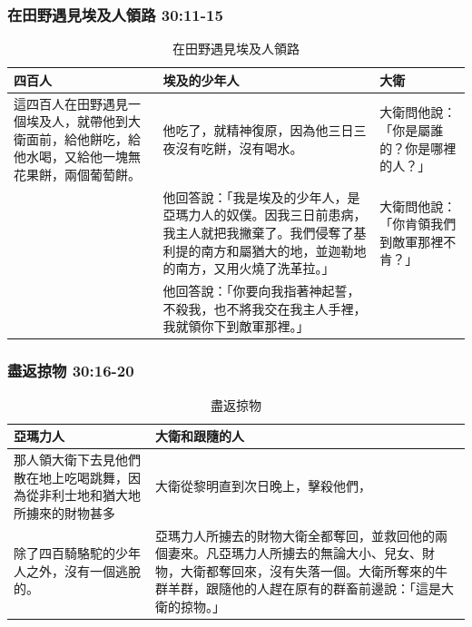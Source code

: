 \subsubsection{在田野遇見埃及人領路 30:11-15}
\begin{table}[H]
\hspace*{-5mm}
\centering
\begin{tabular}{p{5.85cm}|p{}|p{2.5cm}}\hline\hline
四百人&埃及的少年人&大衛\\\hline
這四百人在田野遇見一個埃及人，就帶他到大衛面前，給他餅吃，給他水喝，又給他一塊無花果餅，兩個葡萄餅。
&他吃了，就精神復原，因為他三日三夜沒有吃餅，沒有喝水。 &大衛問他說：「你是屬誰的？你是哪裡的人？」\\\hline
&他回答說：「我是埃及的少年人，是亞瑪力人的奴僕。因我三日前患病，我主人就把我撇棄了。我們侵奪了基利提的南方和屬猶大的地，並迦勒地的南方，又用火燒了洗革拉。」 &大衛問他說：「你肯領我們到敵軍那裡不肯？」\\\hline
&他回答說：「你要向我指著神起誓，不殺我，也不將我交在我主人手裡，我就領你下到敵軍那裡。」 &\\\hline
\end{tabular}
\caption{在田野遇見埃及人領路}
\end{table}

\subsubsection{盡返掠物 30:16-20}
\begin{table}[H]
\hspace*{-5mm}
\centering
\begin{tabular}{p{6.75cm}|p{11.5cm}}\hline\hline
亞瑪力人&大衛和跟隨的人\\\hline
那人領大衛下去見他們散在地上吃喝跳舞，因為從非利士地和猶大地所擄來的財物甚多&大衛從黎明直到次日晚上，擊殺他們，\\\hline
除了四百騎駱駝的少年人之外，沒有一個逃脫的。&亞瑪力人所擄去的財物大衛全都奪回，並救回他的兩個妻來。凡亞瑪力人所擄去的無論大小、兒女、財物，大衛都奪回來，沒有失落一個。大衛所奪來的牛群羊群，跟隨他的人趕在原有的群畜前邊說：「這是大衛的掠物。」\\\hline
\end{tabular}
\caption{盡返掠物}
\end{table}



